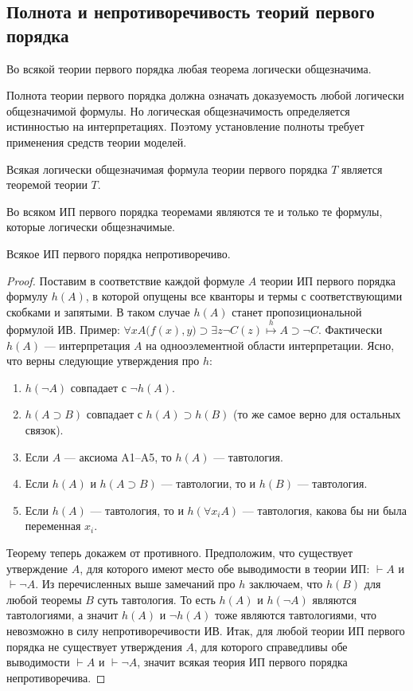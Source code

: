 \subsection{Полнота и непротиворечивость теорий первого порядка}
\begin{lemma}
    Во всякой теории первого порядка любая теорема логически общезначима.
\end{lemma}
Полнота теории первого порядка должна означать доказуемость любой логически общезначимой формулы. Но логическая общезначимость определяется истинностью на интерпретациях. Поэтому установление полноты требует применения средств теории моделей.
\begin{lemma}
    Всякая логически общезначимая формула теории первого порядка $T$ является теоремой теории $T$.
\end{lemma}
\begin{theorem}
    Во всяком ИП первого порядка теоремами являются те и только те формулы, которые логически общезначимые.
\end{theorem}
\begin{theorem}
    Всякое ИП первого порядка непротиворечиво.
\end{theorem}
\begin{proof}
    Поставим в соответствие каждой формуле $A$ теории ИП первого порядка формулу $h(A)$, в которой опущены все кванторы и термы с соответствующими скобками и запятыми. В таком случае $h(A)$ станет пропозициональной формулой ИВ. Пример: $\forall xA\big(f(x), y\big) \supset \exists z\neg C(z) \overset{h}{\longmapsto} A \supset \neg C$. Фактически $h(A)$ --- интерпретация $A$ на однооэлементной области интерпретации. Ясно, что верны следующие утверждения про $h$:
    \begin{enumerate}
        \item $h(\neg A)$ совпадает с $\neg h(A)$.
        \item $h(A \supset B)$ совпадает с $h(A) \supset h(B)$ (то же самое верно для остальных связок).
        \item Если $A$ --- аксиома A1--A5, то $h(A)$ --- тавтология.
        \item Если $h(A)$ и $h(A \supset B)$ --- тавтологии, то и $h(B)$ --- тавтология.
        \item Если $h(A)$ --- тавтология, то и $h(\forall x_iA)$ --- тавтология, какова бы ни была переменная $x_i$.
    \end{enumerate}
    Теорему теперь докажем от противного. Предположим, что существует утверждение $A$, для которого имеют место обе выводимости в теории ИП: $\vdash A$ и $\vdash \neg A$. Из перечисленных выше замечаний про $h$ заключаем, что $h(B)$ для любой теоремы $B$ суть тавтология. То есть $h(A)$ и $h(\neg A)$ являются тавтологиями, а значит $h(A)$ и $\neg h(A)$ тоже являются тавтологиями, что невозможно в силу непротиворечивости ИВ. Итак, для любой теории ИП первого порядка не существует утверждения $A$, для которого справедливы обе выводимости $\vdash A$ и $\vdash \neg A$, значит всякая теория ИП первого порядка непротиворечива.
\end{proof}